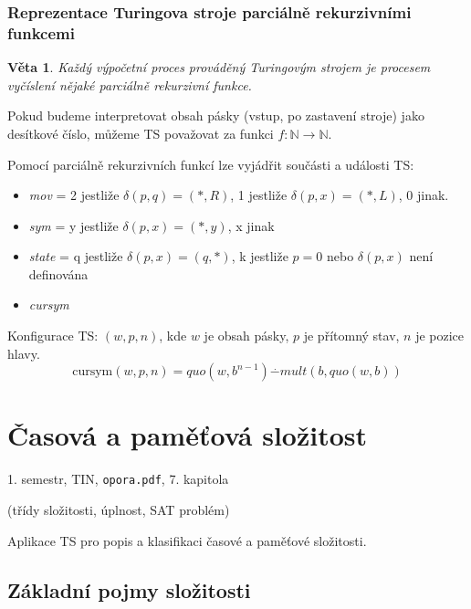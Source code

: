 \documentclass[a4paper, 11pt]{report}
\newtheorem{veta}{Věta}[chapter]
\begin{document}
\subsection{Reprezentace Turingova stroje parciálně rekurzivními funkcemi}
\begin{veta}
Každý výpočetní proces prováděný Turingovým strojem je procesem vyčíslení nějaké parciálně rekurzivní funkce.
\end{veta}
Pokud budeme interpretovat obsah pásky (vstup, po zastavení stroje) jako desítkové číslo, můžeme TS považovat za funkci $f: \mathbb{N} \to \mathbb{N}$.

Pomocí parciálně rekurzivních funkcí lze vyjádřit součásti a události TS:
\begin{itemize}
	\item \emph{mov} = 2 jestliže $\delta(p, q) = (*, R)$, 1 jestliže $\delta(p, x) = (*, L)$, 0 jinak.
	\item \emph{sym} = y jestliže $\delta(p, x) = (*, y)$, x jinak
	\item \emph{state} = q jestliže $\delta(p, x) = (q, *)$, k jestliže $p=0$ nebo $\delta(p, x)$ není definována
	\item \emph{cursym}
\end{itemize}
Konfigurace TS: $(w, p, n)$, kde $w$ je obsah pásky, $p$ je přítomný stav, $n$ je pozice hlavy.
$$\text{cursym}(w, p, n) = quo(w, b^{n-1}) \overset{\cdot}{-} mult(b, quo(w, b))$$















\chapter{Časová a paměťová složitost} \label{cha:25}
1. semestr, TIN, \texttt{opora.pdf}, 7. kapitola

(třídy složitosti, úplnost, SAT problém)

Aplikace TS pro popis a klasifikaci časové a paměťové složitosti.

\section{Základní pojmy složitosti}
\end{document}
